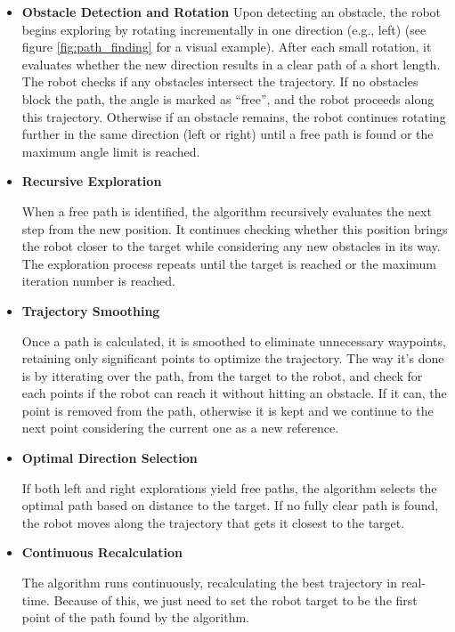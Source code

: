 \begin{itemize}
    \item \textbf{Obstacle Detection and Rotation}
    Upon detecting an obstacle, the robot begins exploring by rotating incrementally in one direction (e.g., left) (see figure \ref{fig:path_finding} for a visual example). After each small rotation, it evaluates whether the new direction results in a clear path of a short length. The robot checks if any obstacles intersect the trajectory.
    If no obstacles block the path, the angle is marked as “free”, and the robot proceeds along this trajectory.
    Otherwise if an obstacle remains, the robot continues rotating further in the same direction (left or right) until a free path is found or the maximum angle limit is reached.

    \item \textbf{Recursive Exploration}

    When a free path is identified, the algorithm recursively evaluates the next step from the new position. It continues checking whether this position brings the robot closer to the target while considering any new obstacles in its way. The exploration process repeats until the target is reached or the maximum iteration number is reached.

    \item \textbf{Trajectory Smoothing}

    Once a path is calculated, it is smoothed to eliminate unnecessary waypoints, retaining only significant points to optimize the trajectory. The way it's done is by itterating over the path, from the target to the robot, and check for each points if the robot can reach it without hitting an obstacle. If it can, the point is removed from the path, otherwise it is kept and we continue to the next point considering the current one as a new reference.

    \item \textbf{Optimal Direction Selection}

    If both left and right explorations yield free paths, the algorithm selects the optimal path based on distance to the target. If no fully clear path is found, the robot moves along the trajectory that gets it closest to the target.

    \item \textbf{Continuous Recalculation}

    The algorithm runs continuously, recalculating the best trajectory in real-time. Because of this, we just need to set the robot target to be the first point of the path found by the algorithm.
\end{itemize}

